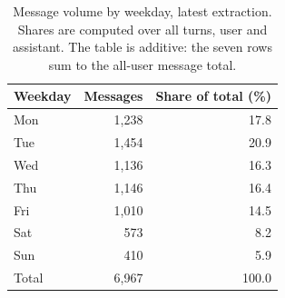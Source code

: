 \begin{table}[htbp]
\centering
\caption{Message volume by weekday, latest extraction. Shares are computed
over all turns, user and assistant. The table is additive: the seven rows
sum to the all-user message total.}
\label{tab:s3}
\begin{tabular}{lrr}
\toprule
Weekday & Messages & Share of total (\%) \\
\midrule
Mon & 1,238 & 17.8 \\
Tue & 1,454 & 20.9 \\
Wed & 1,136 & 16.3 \\
Thu & 1,146 & 16.4 \\
Fri & 1,010 & 14.5 \\
Sat & 573 & 8.2 \\
Sun & 410 & 5.9 \\
\midrule
Total & 6,967 & 100.0 \\
\bottomrule
\end{tabular}
\end{table}
